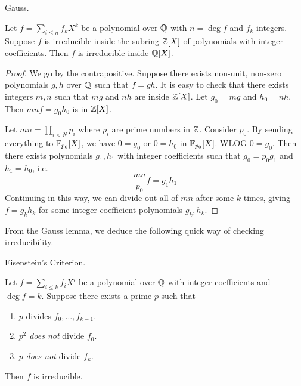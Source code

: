 \documentclass[../book.tex]{subfiles}
\begin{document}
\begin{lem} Gauss.
    
    Let $f = \sum_{i \leq n} f_k X^k$ be a polynomial over $\mathbb{Q}$ 
    with $n = \deg f$ and $f_k$ integers. 
    Suppose $f$ is irreducible inside the subring $\mathbb{Z}[X]$ 
    of polynomials with integer coefficients. 
    Then $f$ is irreducible inside $\mathbb{Q}[X]$. 
    
\end{lem}
\begin{proof}
    
    We go by the contrapositive. 
    Suppose there exists non-unit, non-zero polynomials $g, h$ over $\mathbb{Q}$
    such that $f = g h$. 
    It is easy to check that there exists integers $m, n$ such that 
    $m g$ and $n h$ are inside $\mathbb{Z}[X]$. 
    Let $g_0 = mg$ and $h_0 = nh$. 
    Then $m n f = g_0 h_0$ is in $\mathbb{Z}[X]$.
    
    Let $m n = \prod_{i < N} p_i$ where $p_i$ are prime numbers in $\mathbb{Z}$. 
    Consider $p_0$. By sending everything to $\mathbb{F}_{p_0}[X]$, 
    we have $0 = g_0$ or $0 = h_0$ in $\mathbb{F}_{p_0}[X]$. 
    WLOG $0 = g_0$. Then there exists polynomials $g_1, h_1$ with integer coefficients
    such that $g_0 = p_0 g_1$ and $h_1 = h_0$,
    i.e. \[
        \frac{mn}{p_0} f = g_1 h_1
    \]
    Continuing in this way, we can divide out all of $mn$ after some $k$-times,  
    giving $f = g_k h_k$ for some integer-coefficient polynomials $g_k, h_k$. 
    
\end{proof}
From the Gauss lemma, we deduce the following quick way of checking irreducibility. 
\begin{thm} Eisenstein's Criterion.
    
    Let $f = \sum_{i \leq k} f_i X^i$ be a polynomial over $\mathbb{Q}$ 
    with integer coefficients and $\deg f = k$.
    Suppose there exists a prime $p$ such that \begin{enumerate}
        \item $p$ divides $f_0, \dots, f_{k-1}$.
        \item $p^2$ \emph{does not} divide $f_0$.
        \item $p$ \emph{does not} divide $f_k$.
    \end{enumerate}
    Then $f$ is irreducible. 
    
\end{thm}
\end{document}
